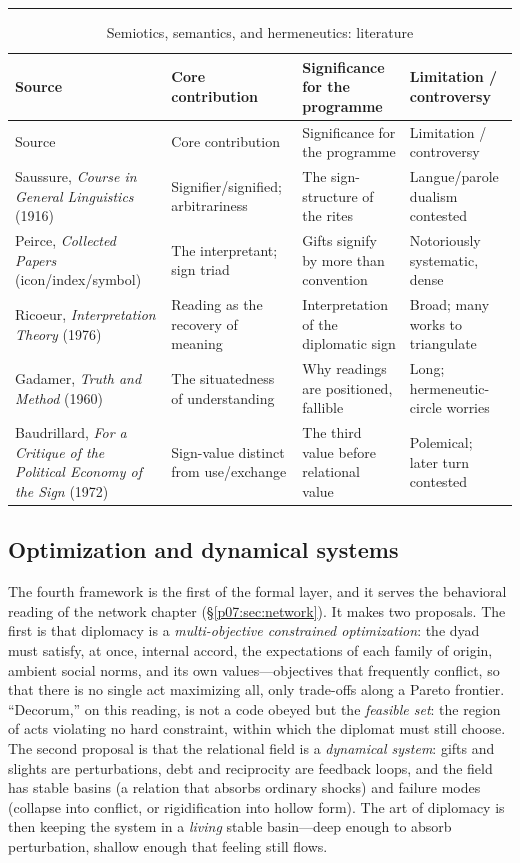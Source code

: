 \documentclass[11pt,a4paper]{article}
\newcommand{\goldrule}{\noindent\textcolor{gold}{\rule{\linewidth}{0.6pt}}\par\vspace{0.4em}}
\newcommand{\xref}[1]{\textcolor{rose}{\S\ref{#1}}}
\begin{document}
\goldrule
\footnotesize
\begin{longtable}{Y Y Y Y}
\caption{Semiotics, semantics, and hermeneutics: literature}\label{p07:tab:lit-semiotics}\\
\toprule
{}
Source & Core contribution & Significance for the programme & Limitation / controversy \\
\midrule
\endfirsthead
{}
Source & Core contribution & Significance for the programme & Limitation / controversy \\
\midrule
\endhead
Saussure, \emph{Course in General Linguistics} (1916) & Signifier/signified; arbitrariness & The sign-structure of the rites & Langue/parole dualism contested \\
Peirce, \emph{Collected Papers} (icon/index/symbol) & The interpretant; sign triad & Gifts signify by more than convention & Notoriously systematic, dense \\
Ricoeur, \emph{Interpretation Theory} (1976) & Reading as the recovery of meaning & Interpretation of the diplomatic sign & Broad; many works to triangulate \\
Gadamer, \emph{Truth and Method} (1960) & The situatedness of understanding & Why readings are positioned, fallible & Long; hermeneutic-circle worries \\
Baudrillard, \emph{For a Critique of the Political Economy of the Sign} (1972) & Sign-value distinct from use/exchange & The third value before relational value & Polemical; later turn contested \\
\bottomrule
\end{longtable}

\subsection{Optimization and dynamical systems}
The fourth framework is the first of the formal layer, and it serves the behavioral reading of the network chapter (\xref{p07:sec:network}). It makes two proposals. The first is that diplomacy is a \emph{multi-objective constrained optimization}: the dyad must satisfy, at once, internal accord, the expectations of each family of origin, ambient social norms, and its own values---objectives that frequently conflict, so that there is no single act maximizing all, only trade-offs along a Pareto frontier. ``Decorum,'' on this reading, is not a code obeyed but the \emph{feasible set}: the region of acts violating no hard constraint, within which the diplomat must still choose. The second proposal is that the relational field is a \emph{dynamical system}: gifts and slights are perturbations, debt and reciprocity are feedback loops, and the field has stable basins (a relation that absorbs ordinary shocks) and failure modes (collapse into conflict, or rigidification into hollow form). The art of diplomacy is then keeping the system in a \emph{living} stable basin---deep enough to absorb perturbation, shallow enough that feeling still flows.
\end{document}
